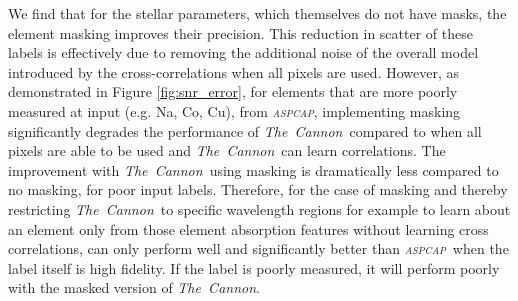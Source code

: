 \documentclass[14pt, preprint2]{aastex6}
\newcommand{\project}[1]{\textsl{#1}}
\newcommand{\tc}{\project{The~Cannon}}
\newcommand{\apogee}{\project{\textsc{apogee}}}
\newcommand{\aspcap}{\project{\textsc{aspcap}}}
\begin{document}
We find that for the stellar parameters, which themselves do not have masks, the element masking improves their precision. This reduction in scatter of these labels is effectively due to removing the additional noise of the overall model introduced by the cross-correlations when all pixels are used. However, as demonstrated in Figure \ref{fig:snr_error}, for elements that are more poorly measured at input (e.g. Na, Co, Cu), from \aspcap, implementing masking significantly degrades the performance of \tc\ compared to when all pixels are able to be used and \tc\ can learn correlations. The improvement with \tc\ using masking is dramatically less compared to no masking, for poor input labels. Therefore, for the case of masking and thereby restricting \tc\ to specific wavelength regions for example to learn about an element only from those element absorption features without learning cross correlations, can only perform well and significantly better than \aspcap\ when the label itself is high fidelity. If the label is poorly measured, it will perform poorly with the masked version of \tc. 







\end{document}

